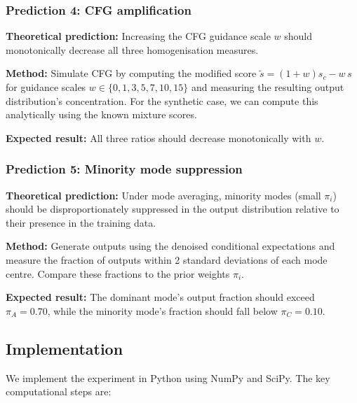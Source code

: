 \documentclass[11pt]{article}
\begin{document}
\subsubsection{Prediction 4: CFG amplification}

\textbf{Theoretical prediction:} Increasing the CFG guidance scale $w$ should monotonically decrease all three homogenisation measures.

\textbf{Method:} Simulate CFG by computing the modified score $\tilde{s} = (1+w) s_c - w\, s$ for guidance scales $w \in \{0, 1, 3, 5, 7, 10, 15\}$ and measuring the resulting output distribution's concentration. For the synthetic case, we can compute this analytically using the known mixture scores.

\textbf{Expected result:} All three ratios should decrease monotonically with $w$.

\subsubsection{Prediction 5: Minority mode suppression}

\textbf{Theoretical prediction:} Under mode averaging, minority modes (small $\pi_i$) should be disproportionately suppressed in the output distribution relative to their presence in the training data.

\textbf{Method:} Generate outputs using the denoised conditional expectations and measure the fraction of outputs within 2 standard deviations of each mode centre. Compare these fractions to the prior weights $\pi_i$.

\textbf{Expected result:} The dominant mode's output fraction should exceed $\pi_A = 0.70$, while the minority mode's fraction should fall below $\pi_C = 0.10$.

\subsection{Implementation}

We implement the experiment in Python using NumPy and SciPy. The key computational steps are:
\end{document}
